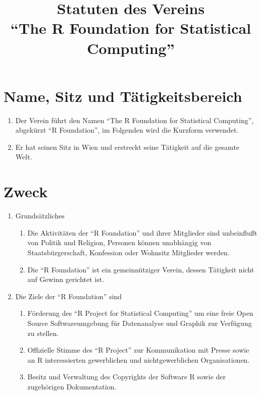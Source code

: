 \documentclass[a4paper]{article}
\title{\bf Statuten des Vereins\\
  "`The R Foundation for Statistical Computing"'}
\newcommand{\RF}{"`R Foundation"'}
\begin{document}
\maketitle

\section{Name, Sitz und T{\"a}tigkeitsbereich}

\begin{enumerate}
  
 \item Der Verein f{\"u}hrt den Namen "`The R Foundation for Statistical
  Computing"', abgek{\"u}rzt \RF{}, im Folgenden wird die Kurzform verwendet.
 \item Er hat seinen Sitz in Wien und erstreckt seine T{\"a}tigkeit auf
  die gesamte Welt.
\end{enumerate}

\section{Zweck}

\begin{enumerate}
 \item Grunds{\"a}tzliches
  \begin{enumerate}
   \item Die Aktivit{\"a}ten der \RF{} und ihrer Mitglieder sind
    unbeinflu{\ss}t von Politik und Religion, Personen k{\"o}nnen unabh{\"a}ngig
    von Staatsb{\"u}rgerschaft, Konfession oder Wohnsitz Mitglieder
    werden.
    
   \item Die \RF{} ist ein gemeinn{\"u}tziger Verein, dessen T{\"a}tigkeit
    nicht auf Gewinn gerichtet ist.
  \end{enumerate}
 \item Die Ziele der \RF{} sind
  \begin{enumerate}
   \item F{\"o}rderung des "`R Project for Statistical Computing"' um eine
    freie Open Source Softwareumgebung f{\"u}r Datenanalyse und Graphik zur
    Verf{\"u}gung zu stellen.
    
   \item Offizielle Stimme des "`R Project"' zur Kommunikation mit
    Presse sowie an R interessierten gewerblichen und
    nichtgewerblichen Organisationen.

   \item Besitz und Verwaltung des Copyrights der Software R sowie der
    zugeh{\"o}rigen Dokumentation.
  \end{enumerate}
\end{enumerate}
\end{document}
